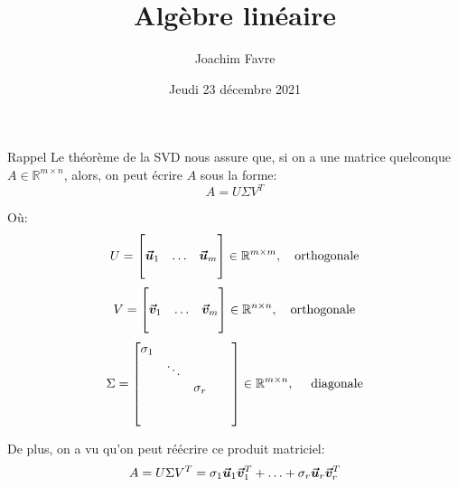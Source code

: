 \documentclass[a4paper]{article}
\title{Algèbre linéaire}
\author{Joachim Favre}
\date{Jeudi 23 décembre 2021}
\begin{document}
\maketitle


\begin{parag}{Rappel}
    Le théorème de la SVD nous assure que, si on a une matrice quelconque $A \in \mathbb{R}^{m \times n}$, alors, on peut écrire $A$ sous la forme:
    \[A = U \Sigma V^T\]

    Où:
    \[U = \begin{bmatrix}  &  &  \\ \bm{\protect\vec{u}}_1 & \ldots & \bm{\protect\vec{u}}_m \\  &  &  \end{bmatrix} \in \mathbb{R}^{m \times m}, \quad \text{orthogonale}\]
    \[V = \begin{bmatrix}  &  &  \\ \bm{\protect\vec{v}}_1 & \ldots & \bm{\protect\vec{v}}_m \\  &  &  \end{bmatrix} \in \mathbb{R}^{n \times n}, \quad \text{orthogonale}\]
    \[\Sigma = \begin{bmatrix} \sigma_1 &  &  &  &  \\  & \ddots &  &  &  \\  &  & \sigma_r &  &  \\  &  &  &  &  \\  &  &  &  &  \end{bmatrix} \in \mathbb{R}^{m \times n}, \quad \text{ diagonale} \]

    De plus, on a vu qu'on peut réécrire ce produit matriciel: 
    \[A = U\Sigma V^T = \sigma_1 \bm{\protect\vec{u}}_1 \bm{\protect\vec{v}}_1^T + \ldots + \sigma_r \bm{\protect\vec{u}}_r \bm{\protect\vec{v}}_r^T\]
    
\end{parag}
\end{document}
